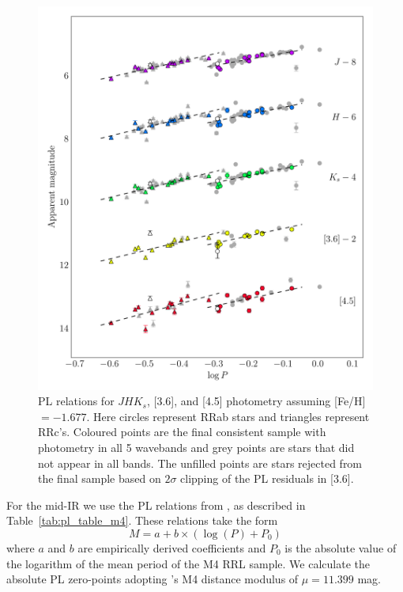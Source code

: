 \documentclass[a4paper,fleqn,usenatbib]{mnras}
\begin{document}
\begin{figure}
\begin{center}
\includegraphics[width=160mm]{reworked_fitting_code/final_plots/multiwavelength_PL_m4_clipped.pdf}
\caption{PL relations for $J\!H\!K_s$, [3.6], and [4.5] photometry assuming [Fe/H]$=-1.677$. Here circles represent RRab stars and triangles represent RRc's. Coloured points are the final consistent sample with photometry in all 5 wavebands and grey points are stars that did not appear in all bands. The unfilled points are stars rejected from the final sample based on $2\sigma$ clipping of the PL residuals in [3.6].}
\label{fig:omegaCen_pl_m4}
\end{center}
\end{figure}

For the mid-IR we use the PL relations from \citet{2015ApJ...808...11N}, as described in Table~\ref{tab:pl_table_m4}. These relations take the form
\begin{equation}M = a + b \times (\log (P) + P_0) \end{equation}
where $a$ and $b$ are empirically derived coefficients and $P_0$ is the absolute value of the logarithm of the mean period of the M4 RRL sample. We calculate the absolute PL zero-points adopting \citeauthor{2015ApJ...808...11N}'s M4 distance modulus of $\mu=11.399$ mag.
\end{document}
